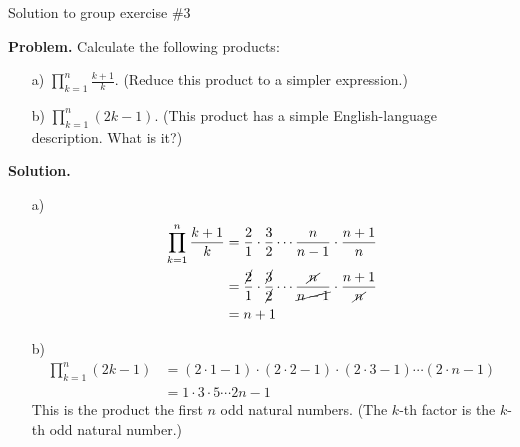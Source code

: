 \documentclass[10pt]{beamer}
\begin{document}
\begin{frame}{Solution to group exercise \#3}
\footnotesize 

\textbf{Problem.}  Calculate the following products:
	\begin{itemize}
	\item[a)] $\prod_{k=1}^n \frac{k+1}{k}$.  \qquad (Reduce this product to a simpler expression.)
	\item[b)] $\prod_{k=1}^n (2k-1)$.  \qquad  (This product has a simple English-language description.  What is it?)
	\end{itemize}
\vfill 

\textbf{Solution.}
	\begin{itemize}
	\item[a)] 
	\begin{align*}
	\prod_{k=1}^n \frac{k+1}{k} &= \frac{2}{1} \cdot \frac{3}{2} \cdots \frac{n}{n-1} \cdot \frac{n+1}{n} \\
	&= \frac{\cancel{2}}{1} \cdot \frac{\cancel{3}}{\cancel{2}} \cdots \frac{\cancel{n}}{\cancel{n-1}} \cdot \frac{n+1}{\cancel{n}} \\
	&= n+1
	\end{align*}
	\item[b)] 
	\begin{align*}
	\prod_{k=1}^n (2k-1) &= (2 \cdot 1 -1) \cdot (2 \cdot 2 -1) \cdot (2 \cdot 3 -1) \cdots  (2 \cdot n -1) \\
	&= 1 \cdot 3 \cdot 5 \cdots 2n-1
	\end{align*}
	This is the product the first $n$ odd natural numbers. (The $k$-th factor is the $k$-th odd natural number.)
	\end{itemize}

\end{frame}
\end{document}
